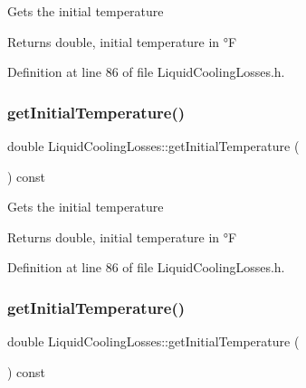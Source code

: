 Gets the initial temperature \begin{DoxyReturn}{Returns}
double, initial temperature in °F 
\end{DoxyReturn}


Definition at line 86 of file Liquid\+Cooling\+Losses.\+h.

\mbox{\label{class_liquid_cooling_losses_a4cfb23800b80e99858bbc5c3ef5169eb}} 
\subsubsection{\texorpdfstring{get\+Initial\+Temperature()}{getInitialTemperature()}\hspace{0.1cm}{\footnotesize\ttfamily [2/3]}}
{\footnotesize\ttfamily double Liquid\+Cooling\+Losses\+::get\+Initial\+Temperature (\begin{DoxyParamCaption}{ }\end{DoxyParamCaption}) const\hspace{0.3cm}{\ttfamily [inline]}}

Gets the initial temperature \begin{DoxyReturn}{Returns}
double, initial temperature in °F 
\end{DoxyReturn}


Definition at line 86 of file Liquid\+Cooling\+Losses.\+h.

\mbox{\label{class_liquid_cooling_losses_a4cfb23800b80e99858bbc5c3ef5169eb}} 
\subsubsection{\texorpdfstring{get\+Initial\+Temperature()}{getInitialTemperature()}\hspace{0.1cm}{\footnotesize\ttfamily [3/3]}}
{\footnotesize\ttfamily double Liquid\+Cooling\+Losses\+::get\+Initial\+Temperature (\begin{DoxyParamCaption}{ }\end{DoxyParamCaption}) const\hspace{0.3cm}{\ttfamily [inline]}}

